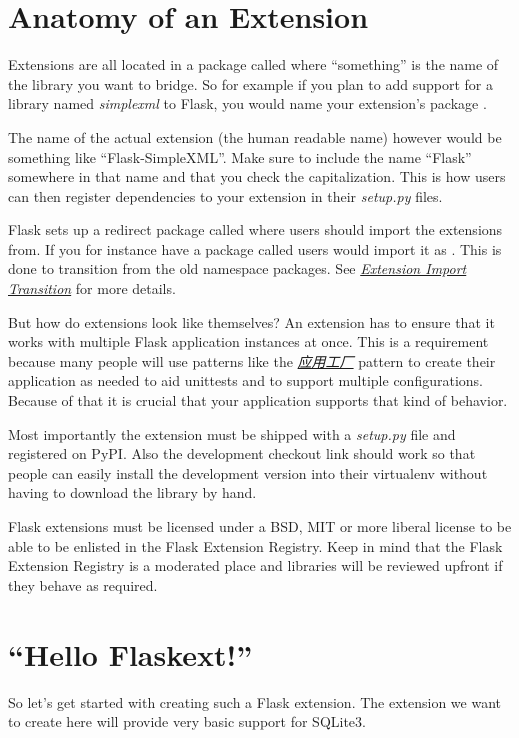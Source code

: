 \documentclass[a4paper,12pt]{sphinxmanual}
\begin{document}
\section{Anatomy of an Extension}
\label{extensiondev:anatomy-of-an-extension}\label{extensiondev:flask-extension-registry}
Extensions are all located in a package called 
where ``something'' is the name of the library you want to bridge.  So for
example if you plan to add support for a library named \emph{simplexml} to
Flask, you would name your extension's package .

The name of the actual extension (the human readable name) however would
be something like ``Flask-SimpleXML''.  Make sure to include the name
``Flask'' somewhere in that name and that you check the capitalization.
This is how users can then register dependencies to your extension in
their \emph{setup.py} files.

Flask sets up a redirect package called  where users
should import the extensions from.  If you for instance have a package
called  users would import it as
.  This is done to transition from the old
namespace packages.  See {\hyperref[extensiondev:ext-import-transition]{\emph{Extension Import Transition}}} for more details.

But how do extensions look like themselves?  An extension has to ensure
that it works with multiple Flask application instances at once.  This is
a requirement because many people will use patterns like the
{\hyperref[patterns/appfactories:app-factories]{\emph{应用工厂}}} pattern to create their application as needed to aid
unittests and to support multiple configurations.  Because of that it is
crucial that your application supports that kind of behavior.

Most importantly the extension must be shipped with a \emph{setup.py} file and
registered on PyPI.  Also the development checkout link should work so
that people can easily install the development version into their
virtualenv without having to download the library by hand.

Flask extensions must be licensed under a BSD, MIT or more liberal license
to be able to be enlisted in the Flask Extension Registry.  Keep in mind
that the Flask Extension Registry is a moderated place and libraries will
be reviewed upfront if they behave as required.


\section{``Hello Flaskext!''}
\label{extensiondev:hello-flaskext}
So let's get started with creating such a Flask extension.  The extension
we want to create here will provide very basic support for SQLite3.
\end{document}
